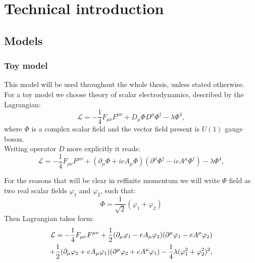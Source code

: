 \chapter{Technical introduction}
\section{Models}
\subsection{Toy model}
This model will be used throughout the whole thesis, unless stated otherwise. \\
For a toy model we choose theory of scalar electrodynamics, described by the Lagrangian:
\begin{equation}
\mathcal{L} = -\frac{1}{4}F_{\mu\nu}F^{\mu\nu}+D_\mu\Phi D^\mu\Phi^\dag-\lambda\Phi^4,
\end{equation}
where $\Phi$ is a complex scalar field and the vector field present is $U(1)$ gauge boson. \\


Writing operator $D$ more explicitly it reads:
\begin{equation}
\mathcal{L} = -\frac{1}{4}F_{\mu\nu}F^{\mu\nu}+(\partial_\mu\Phi + ieA_\mu\Phi) 
(\partial^\mu\Phi^\dag-ieA^\mu\Phi^\dag)-\lambda\Phi^4,
\end{equation}

For the reasons that will be clear in ref{finite momentum} we will write $\Phi$ 
field as two real scalar fields 
$\varphi_1$ and $\varphi_2$, such that:
\begin{equation}
\Phi = \frac{1}{\sqrt{2}}(\varphi_1+\varphi_2)
\end{equation}
Then Lagrangian takes form:
\begin{align}
\mathcal{L} = -\frac{1}{4}F_{\mu\nu}F^{\mu\nu}+ \frac{1}{2}(\partial_\mu\varphi_1 - eA_\mu\varphi_2)
(\partial^\mu\varphi_1 - eA^\mu\varphi_2)  \\
+\frac{1}{2}(\partial_\mu\varphi_2+eA_\mu\varphi_1)(\partial^\mu\varphi_2+eA^\mu\varphi_1) 
-\frac{1}{4}\lambda(\varphi_1^2+\varphi_2^2)^2,\notag
\end{align}

